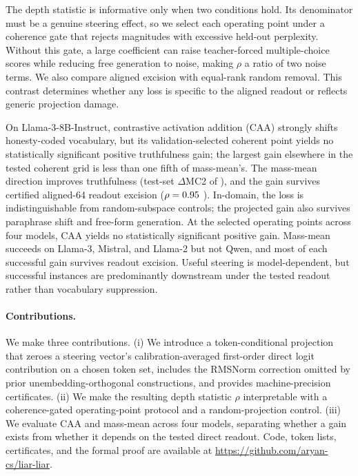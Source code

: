 The depth statistic is informative only when two conditions hold. Its denominator must be a genuine steering effect, so we select each operating point under a coherence gate that rejects magnitudes with excessive held-out perplexity. Without this gate, a large coefficient can raise teacher-forced multiple-choice scores while reducing free generation to noise, making $\rho$ a ratio of two noise terms. We also compare aligned excision with equal-rank random removal. This contrast determines whether any loss is specific to the aligned readout or reflects generic projection damage.

On Llama-3-8B-Instruct, contrastive activation addition (CAA) strongly shifts honesty-coded vocabulary, but its validation-selected coherent point yields no statistically significant positive truthfulness gain; the largest gain elsewhere in the tested coherent grid is less than one fifth of mass-mean's. The mass-mean direction improves truthfulness (test-set $\Delta$MC2 of \MmTestDelta{} \MmTestDeltaCI), and the gain survives certified aligned-64 readout excision ($\rho = 0.95$ \MmRhoAlSixtyFourCI). In-domain, the loss is indistinguishable from random-subspace controls; the projected gain also survives paraphrase shift and free-form generation. At the selected operating points across four models, CAA yields no statistically significant positive gain. Mass-mean succeeds on Llama-3, Mistral, and Llama-2 but not Qwen, and most of each successful gain survives readout excision. Useful steering is model-dependent, but successful instances are predominantly downstream under the tested readout rather than vocabulary suppression.

\paragraph{Contributions.}
We make three contributions. (i) We introduce a token-conditional projection that zeroes a steering vector's calibration-averaged first-order direct logit contribution on a chosen token set, includes the RMSNorm correction omitted by prior unembedding-orthogonal constructions, and provides machine-precision certificates. (ii) We make the resulting depth statistic $\rho$ interpretable with a coherence-gated operating-point protocol and a random-projection control. (iii) We evaluate CAA and mass-mean across four models, separating whether a gain exists from whether it depends on the tested direct readout. Code, token lists, certificates, and the formal proof are available at \url{https://github.com/aryan-cs/liar-liar}.
